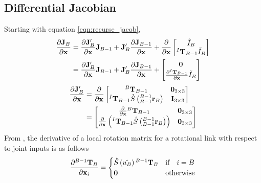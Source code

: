 \subsection{Differential Jacobian}

\noindent Starting with equation \ref{eqn:recurse_jacob},
\begin{align} \nonumber
    \frac{\partial\mathbf{J}_B}{\partial{\mathbf{{x}}}} &= \frac{\partial \mathbf{J}_B'}{\partial{\mathbf{{x}}}}\mathbf{J}_{B-1} + \mathbf{J}_B' \frac{\partial\mathbf{J}_{B-1}}{\partial{\mathbf{{x}}}} + \frac{\partial}{\partial{\mathbf{{x}}}}\begin{bmatrix} 
			{\hat{I}_B} \\
			{{^I\mathbf{T}_{B-1}}\Tilde{I}_B} \\
			\end{bmatrix}  \\
			&= \frac{\partial \mathbf{J}_B'}{\partial{\mathbf{{x}}}}\mathbf{J}_{B-1} + \mathbf{J}_B' \frac{\partial\mathbf{J}_{B-1}}{\partial{\mathbf{{x}}}} + \begin{bmatrix} 
			{{\mathbf{0}}} \\
			{\frac{\partial^I\mathbf{T}_{B-1}}{\partial{\mathbf{{x}}}}\Tilde{I}_B} \\
			\end{bmatrix}  \label{eqn:d_jacob}
\end{align}
\begin{align} \label{eqn_d_jp}
    \frac{\partial \mathbf{J}_B'}{\partial {\mathbf{{x}}}} &=
    \frac{\partial}{\partial {\mathbf{{x}}}}\begin{bmatrix}
        {^B}\mathbf{T}_{B-1} & {\mathbf{0}}_{3 \times 3} \\
        {^I\mathbf{T}_{B-1}}\mathring{S}\left(^{B-1}_{B-1}\mathbf{r}_{B}\right) & {\mathbf{I}}_{3 \times 3}
    \end{bmatrix} \\
    &=
    \begin{bmatrix}
        \frac{\partial}{\partial {\mathbf{{x}}}}{^B}\mathbf{T}_{B-1} & {\mathbf{0}}_{3 \times 3} \\
       \frac{\partial}{\partial {\mathbf{{x}}}}\left ( {^I\mathbf{T}_{B-1}}\mathring{S}\left(^{B-1}_{B-1}\mathbf{r}_{B}\right) \right) & {\mathbf{0}}_{3 \times 3}
    \end{bmatrix} \nonumber
\end{align}
\noindent From \cite{woolfrey_2018},  the derivative of a local rotation matrix for a rotational link with respect to joint inputs is as follows
\begin{align} \label{eqn:rot_diff}
    \frac{\partial {^{B-1}\mathbf{T}_B}}{\partial {\mathbf{{x}}}_i} = \begin{cases}
    \mathring{S}\left(\hat{u_B}\right){^{B-1}\mathbf{T}_B} & \text{if} \quad i = B\\
    {\mathbf{0}} & \text{otherwise}\\
    \end{cases}
\end{align}
